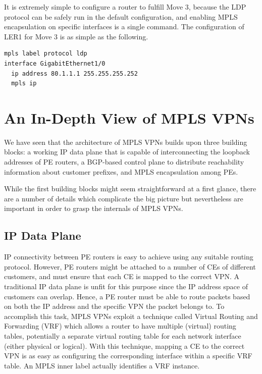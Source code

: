 \documentclass{article}
\newenvironment{codice}
{
\noindent
\begin{minipage}[b]{\columnwidth}
\definecolor{shadecolor}{rgb}{1,1,1}
\begin{framed}}
{
\vspace{-0.4cm}
\end{framed}
\end{minipage}
\definecolor{shadecolor}{rgb}{1,1,0.7}
}
\begin{document}
\begin{shaded}
\noindent
It is extremely simple to configure a router to fulfill Move 3, because the LDP 
protocol can be safely run in the default configuration, and enabling MPLS 
encapsulation on specific interfaces is a single command. The configuration of 
LER1 for Move 3 is as simple as the following.

\begin{codice}
\begin{verbatim}
mpls label protocol ldp
interface GigabitEthernet1/0
  ip address 80.1.1.1 255.255.255.252
  mpls ip
\end{verbatim}
\end{codice}
\end{shaded}
\section{An In-Depth View of MPLS VPNs}\label{se:details}

We have seen that the architecture of MPLS VPNs builds upon three building 
blocks: a working IP data plane that is capable of interconnecting the loopback 
addresses of PE routers, a BGP-based control plane to distribute reachability 
information about customer prefixes, and MPLS encapsulation among PEs.

While the first building blocks might seem straightforward at a first glance, 
there are a number of details which complicate the big picture but 
nevertheless are important in order to grasp the internals of MPLS 
VPNs.

%
%
\subsection{IP Data Plane}
IP connectivity between PE routers is easy to achieve using any suitable routing 
protocol. However,
PE routers might be attached to a number of CEs of different 
customers, and must ensure that each CE is mapped to the correct VPN. A 
traditional IP data plane is unfit for this purpose since the IP address space 
of customers can overlap. Hence, a PE router must be able to route packets based 
on both the IP address and the specific VPN the packet belongs to. To accomplish 
this task, MPLS VPNs exploit a technique called Virtual Routing and Forwarding 
(VRF) which allows a router to have multiple (virtual) routing tables, 
potentially a separate virtual routing table for each network interface (either 
physical or logical). With this technique, mapping a CE to the correct VPN is as 
easy as configuring the corresponding interface within a specific VRF table. 
An MPLS inner label actually identifies a VRF instance.
\end{document}
